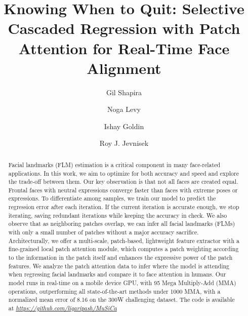 \documentclass[9pt,twocolumn]{extarticle}
\title{\Huge \textbf{ Knowing When to Quit: Selective Cascaded Regression with Patch Attention for Real-Time Face Alignment}}
\author[1,2]{Gil Shapira}
\author[1]{Noga Levy}
\author[1]{Ishay Goldin}
\author[1]{Roy J. Jevnisek}
\affil[1]{Samsung Semiconductor Israel R\&D Center (SIRC)}
\affil[2]{Faculty of Engineering, Bar-Ilan University}
\affil[ ]{\textit {ggiillsshhaappiirraa@gmail.com}}
\affil[ ]{\textit {nogaor@gmail.com}}
\affil[ ]{\textit {\{ishay.goldin,roy.jewnisek\}@samsung.com}}
\date{}
\begin{document}
\maketitle



\begin{abstract}
Facial landmarks (FLM) estimation is a critical component in many face-related applications.
In this work, we aim to optimize for both accuracy and speed and explore the trade-off between them. 
Our key observation is that not all faces are created equal. Frontal faces with neutral expressions converge faster than faces with extreme poses or expressions. To differentiate among samples, we train our model to predict the regression error after each iteration. 
If the current iteration is accurate enough, we stop iterating, saving redundant iterations while keeping the accuracy in check. We also observe that as neighboring patches overlap, we can infer all facial landmarks (FLMs) with only a small number of patches without a major accuracy sacrifice.
Architecturally, we offer a multi-scale, patch-based, lightweight feature extractor with a fine-grained local patch attention module, which computes a patch weighting according to the information in the patch itself and enhances the expressive power of the patch features. We analyze the patch attention data to infer where the model is attending when regressing facial landmarks and compare it to face attention in humans.
Our model runs in real-time on a mobile device GPU, with 95 Mega Multiply-Add (MMA) operations, outperforming all state-of-the-art methods under 1000 MMA, with a normalized mean error of 8.16 on the 300W challenging dataset. The code is available at \emph{\url{https://github.com/ligaripash/MuSiCa}}
\end{abstract}





\end{document}
